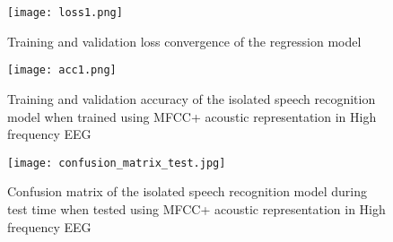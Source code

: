 \documentclass[letterpaper, 10 pt, conference]{ieeeconf}  %
\begin{document}
\begin{figure}[h]
\begin{center}
\texttt{[image: loss1.png]}
\caption{Training and validation loss convergence of the regression model} 
\label{1vsall}
\end{center}
\end{figure}

\begin{figure}[h]
\begin{center}
\texttt{[image: acc1.png]}
\caption{Training and validation accuracy of the isolated speech recognition model when trained using MFCC+ acoustic representation in High frequency EEG} 
\label{1vsall}
\end{center}
\end{figure}

\begin{figure}[h]
\begin{center}
\texttt{[image: confusion\_matrix\_test.jpg]}
\caption{Confusion matrix of the isolated speech recognition model during test time when tested using MFCC+ acoustic representation in High frequency EEG} 
\label{1vsall}
\end{center}
\end{figure}
\end{document}
